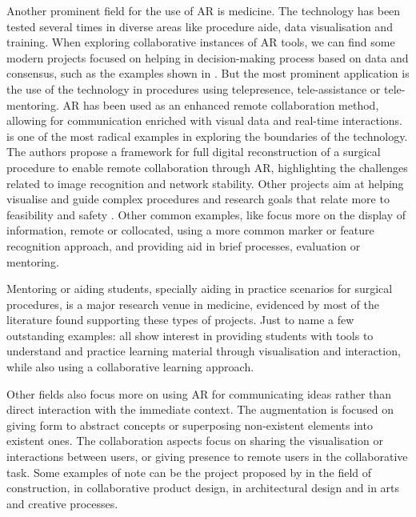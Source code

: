 Another prominent field for the use of \ac{AR} is medicine. The technology has been tested several times in diverse areas like procedure aide, data visualisation and training. When
exploring collaborative instances of \ac{AR} tools, we can find some modern projects focused on helping in decision-making process based on data and consensus, such as the examples shown in
\textcite{friedl-knirsch_2024,yasojima_2012}. But the most prominent application is the use of the technology in procedures using telepresence, tele-assistance or tele-mentoring. \ac{AR} has
been used as an enhanced remote collaboration method, allowing for communication enriched with visual data and real-time interactions. \textcite{wisotzky_2019} is one of the most radical
examples in exploring the boundaries of the technology. The authors propose a framework for full digital reconstruction of a surgical procedure to enable remote collaboration through \ac{AR},
highlighting the challenges related to image recognition and network stability. Other projects aim at helping visualise and guide complex procedures and research goals that relate more to
feasibility and safety \parencite{alismail_2019,jun_2023}. Other common examples, like \textcite{yu_2023,augello_2023,pooryousef_2024} focus more on the display of information, remote or
collocated, using a more common marker or feature recognition approach, and providing aid in brief processes, evaluation or mentoring.

Mentoring or aiding students, specially aiding in practice scenarios for surgical procedures, is a major research venue in medicine, evidenced by most of the literature found supporting
these types of projects. Just to name a few outstanding examples: \textcite{schott_2024,gasques_2021,moro_2021,huang_2018} all show interest in providing students with tools to understand
and practice learning material through visualisation and interaction, while also using a collaborative learning approach.

Other fields also focus more on using \ac{AR} for communicating ideas rather than direct interaction with the immediate context. The augmentation is focused on giving form to abstract
concepts or superposing non-existent elements into existent ones. The collaboration aspects focus on sharing the visualisation or interactions between users, or giving presence to remote
users in the collaborative task. Some examples of note can be the project proposed by \textcite{garbett_2021} in the field of construction, \textcite{shen_2010} in collaborative product
design, \textcite{ahn_2019} in architectural design and \textcite{sanabria_2017} in arts and creative processes.

